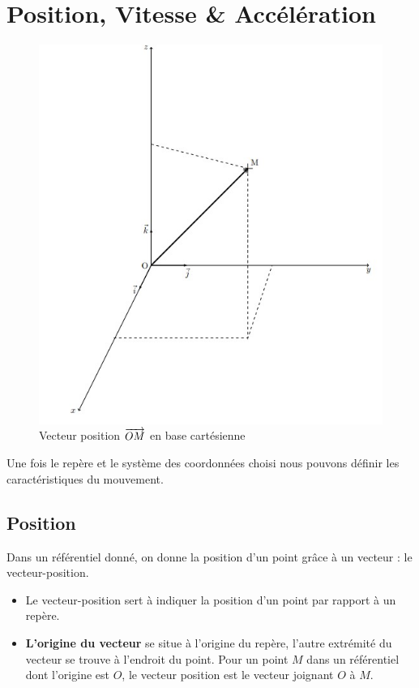 \documentclass[11pt,a4paper]{article}
\begin{document}
\section{Position, Vitesse \& Accélération}

\begingroup
\begin{figure}
    \centering
    \includegraphics[width=0.9\linewidth]{imgs/p1/OM.jpg}
\caption{Vecteur position $\overrightarrow{OM}$ en base cartésienne}
\end{figure}

Une fois le repère et le système des coordonnées choisi nous pouvons définir les caractéristiques du mouvement. 

\subsection{Position}

Dans un référentiel donné, on donne la position d’un point grâce à un vecteur : le vecteur-position. 

\begin{itemize}
    \item Le vecteur-position sert à indiquer la position d’un point par rapport à un repère. 
    \item \textbf{L’origine du vecteur} se situe à l’origine du repère, l’autre extrémité du vecteur se trouve à l’endroit du point. Pour un point $M$ dans un référentiel dont l’origine est $O$, le vecteur position est le vecteur joignant $O$ à $M$.
\end{itemize}
\end{document}
